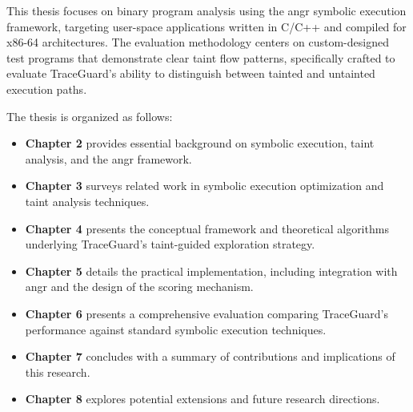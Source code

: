 This thesis focuses on binary program analysis using the angr symbolic execution framework, targeting user-space applications written in C/C++ and compiled for x86-64 architectures. The evaluation methodology centers on custom-designed test programs that demonstrate clear taint flow patterns, specifically crafted to evaluate TraceGuard's ability to distinguish between tainted and untainted execution paths.

The thesis is organized as follows:

\begin{itemize}
    \item \textbf{Chapter 2} provides essential background on symbolic execution, taint analysis, and the angr framework.
    \item \textbf{Chapter 3} surveys related work in symbolic execution optimization and taint analysis techniques.
    \item \textbf{Chapter 4} presents the conceptual framework and theoretical algorithms underlying TraceGuard's taint-guided exploration strategy.
    \item \textbf{Chapter 5} details the practical implementation, including integration with angr and the design of the scoring mechanism.
    \item \textbf{Chapter 6} presents a comprehensive evaluation comparing TraceGuard's performance against standard symbolic execution techniques.
    \item \textbf{Chapter 7} concludes with a summary of contributions and implications of this research.
    \item \textbf{Chapter 8} explores potential extensions and future research directions.
\end{itemize}
